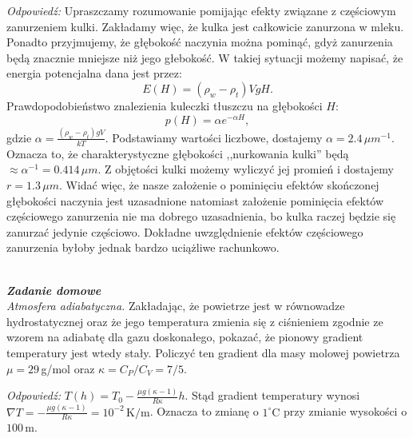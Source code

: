 \documentclass[11pt,a4paper]{article}
\newcounter{zadanie}\newcommand{\zadanie}[1][]{\addtocounter{zadanie}{1} ~\\  {\bf \emph{Zadanie \arabic{zadanie} #1 }} \\}
\newcounter{zaddom}\newcommand{\zaddom}[1][]{\addtocounter{zaddom}{1} ~\\  {\bf \emph{Zadanie domowe \arabic{zaddom} #1 }} \\}
\renewcommand{\t}[1]{\textrm{#1}}
\begin{document}
\emph{Odpowiedź:}
Upraszczamy rozumowanie pomijając efekty związane z częściowym zanurzeniem kulki. Zakładamy więc, że kulka jest całkowicie zanurzona w mleku. Ponadto przyjmujemy, że głębokość naczynia można pominąć, gdyż zanurzenia będą znacznie mniejsze niż jego głebokość.
W takiej sytuacji możemy napisać, że energia potencjalna dana jest przez:
$$
E(H) =  (\rho_w - \rho_t)V g H.
$$
Prawdopodobieństwo znalezienia kuleczki tłuszczu na głębokości $H$:
$$p(H)= \alpha  e^{-\alpha H},$$
gdzie $\alpha =\frac{(\rho_w - \rho_t) g V}{kT}$.
Podstawiamy wartości liczbowe, dostajemy
$\alpha = 2.4\, \mu m^{-1}$.
Oznacza to, że charakterystyczne głębokości ,,nurkowania kulki'' będą  $\approx \alpha^{-1} = 0.414\, \mu m$. Z objętości kulki możemy wyliczyć jej promień i dostajemy $r=1.3\,\mu m$. Widać więc, że nasze założenie o pominięciu efektów  skończonej głębokości naczynia jest uzasadnione natomiast założenie pominięcia efektów częściowego zanurzenia nie ma dobrego uzasadnienia, bo kulka raczej będzie się zanurzać jedynie częściowo. Dokładne uwzględnienie efektów częściowego zanurzenia byłoby jednak bardzo uciążliwe rachunkowo.

\zaddom
{\em Atmosfera adiabatyczna.} Zakładając, że powietrze jest w równowadze hydrostatycznej
oraz że jego temperatura zmienia się z ciśnieniem zgodnie ze wzorem na adiabatę dla gazu
doskonałego, pokazać, że pionowy gradient temperatury jest wtedy stały.
Policzyć ten gradient dla masy molowej powietrza $\mu=29\,$g/mol oraz
$\kappa = C_P/C_V = 7/5$.
\newline

\emph{Odpowiedź:}
$T(h) = T_0 - \frac{\mu g (\kappa-1)}{R\kappa } h$. Stąd gradient temperatury
wynosi $\nabla T  = -\frac{\mu g (\kappa-1)}{R\kappa } = 10^{-2}\, \t{K}/\t{m} $. Oznacza to zmianę o $1^\circ \t{C}$ przy zmianie wysokości o $100\,\t{m}$.

\end{document}
